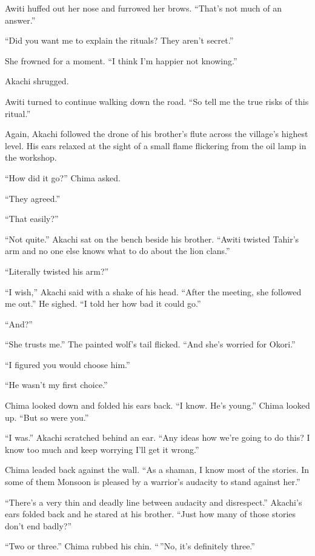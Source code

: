 Awiti huffed out her nose and furrowed her brows. ``That's not much of an answer.''

``Did you want me to explain the rituals? They aren't secret.''

She frowned for a moment. ``I think I'm happier not knowing.''

Akachi shrugged.

Awiti turned to continue walking down the road. ``So tell me the true risks of this ritual.''

\secdiv

\noindent Again, Akachi followed the drone of his brother's flute across the village's highest level. His ears relaxed at the sight of a small flame flickering from the oil lamp in the workshop.

``How did it go?'' Chima asked.

``They agreed.''

``That easily?''

``Not quite.'' Akachi sat on the bench beside his brother. ``Awiti twisted Tahir's arm and no one else knows what to do about the lion clans.''

``Literally twisted his arm?''

``I wish,'' Akachi said with a shake of his head. ``After the meeting, she followed me out.'' He sighed. ``I told her how bad it could go.''

``And?''

``She trusts me.'' The painted wolf's tail flicked. ``And she's worried for Okori.''

``I figured you would choose him.''

``He wasn't my first choice.''

Chima looked down and folded his ears back. ``I know. He's young.'' Chima looked up. ``But so were you.''

``I was.'' Akachi scratched behind an ear. ``Any ideas how we're going to do this? I know too much and keep worrying I'll get it wrong.''

Chima leaded back against the wall. ``As a shaman, I know most of the stories. In some of them Monsoon is pleased by a warrior's audacity to stand against her.''

``There's a very thin and deadly line between audacity and disrespect.'' Akachi's ears folded back and he stared at his brother. ``Just how many of those stories don't end badly?''

``Two or three.'' Chima rubbed his chin. ``\,''No, it's definitely three.''

